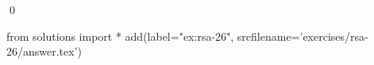 
\begin{ex} 
  \label{ex:rsa-26}
  
  \qed
\end{ex} 
\begin{python0}
from solutions import *
add(label="ex:rsa-26",
    srcfilename='exercises/rsa-26/answer.tex') 
\end{python0}
